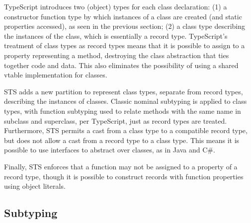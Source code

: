 TypeScript introduces two (object) types for each class declaration: 
(1) a constructor function type by which instances of a class
are created (and static properties accessed), as seen in the previous section; 
(2) a class type describing the instances of the class, which is essentially a record type. 
TypeScript's treatment of class types as record types
means that it is possible to assign to a property representing a method, 
destroying the class abstraction that ties together code and data. This also 
eliminates the possibility of using a shared vtable implementation for classes.

STS adds a new partition to represent class types, separate from record types, describing the instances of classes.
Classic nominal subtyping is applied to class types, with function subtyping used to relate methods with 
the same name in subclass and superclass, per TypeScript, just as record types are treated.
Furthermore, STS permits a cast from a class type
to a compatible record type, but does not allow a cast from a record type to a class type. This means
it is possible to use interfaces to abstract over classes, as in Java and C\#. 

Finally, STS enforces that a function may not
be assigned to a property of a record type, 
though it is possible to construct records with function properties using object literals. 

\subsection{Subtyping}

